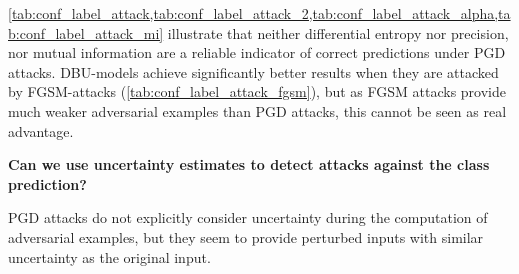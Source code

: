 \cref{tab:conf_label_attack,tab:conf_label_attack_2,tab:conf_label_attack_alpha,tab:conf_label_attack_mi} illustrate that neither differential entropy nor precision, nor mutual information are a reliable indicator of correct predictions under PGD attacks. 
DBU-models achieve significantly better results when they are attacked by FGSM-attacks (\cref{tab:conf_label_attack_fgsm}), but as FGSM attacks provide much weaker adversarial examples than PGD attacks, this cannot be seen as real advantage. 





\clearpage
\textbf{Can we use uncertainty estimates to detect attacks against the class prediction?}

PGD attacks do not explicitly consider uncertainty during the computation of adversarial examples, but they seem to provide perturbed inputs with similar uncertainty as the original input. 



\begin{table}[htbp!]
 	\centering
 	\caption{Attack-Detection based on differential entropy under PGD label attacks (AUC-PR).}
 	\begin{small}
 	\end{small}
 	\label{tab:label_attack_detect_2}
\end{table}





